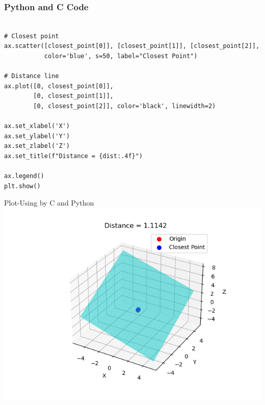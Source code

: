 \documentclass{beamer}
\begin{document}
\begin{frame}[fragile]
\frametitle{Python and C Code}

\begin{lstlisting}

# Closest point
ax.scatter([closest_point[0]], [closest_point[1]], [closest_point[2]],
           color='blue', s=50, label="Closest Point")

# Distance line
ax.plot([0, closest_point[0]],
        [0, closest_point[1]],
        [0, closest_point[2]], color='black', linewidth=2)

ax.set_xlabel('X')
ax.set_ylabel('Y')
ax.set_zlabel('Z')
ax.set_title(f"Distance = {dist:.4f}")

ax.legend()
plt.show()
\end{lstlisting}

\end{frame}


\begin{frame}{Plot-Using by C and Python}
    \centering
    \includegraphics[width=\columnwidth, height=0.8\textheight, keepaspectratio]{Figs/Fig7.1.png}     
\end{frame}
\end{document}
